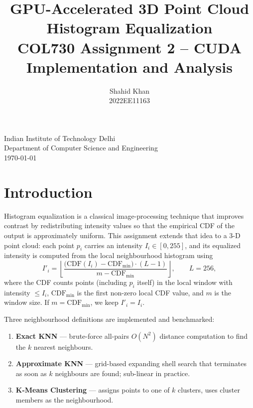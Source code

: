 \documentclass[11pt,a4paper]{article}
\title{\textbf{GPU-Accelerated 3D Point Cloud Histogram Equalization}\\
\large COL730 Assignment 2 -- CUDA Implementation and Analysis}
\author{Shahid Khan \\ 2022EE11163}
\date{}
\begin{document}
\maketitle
\thispagestyle{empty}
\vfill
\begin{center}
\large Indian Institute of Technology Delhi\\
Department of Computer Science and Engineering\\[0.5em]
\today
\end{center}
\newpage

\thispagestyle{empty}
\tableofcontents
\newpage

\section{Introduction}

Histogram equalization is a classical image-processing technique that improves
contrast by redistributing intensity values so that the empirical CDF of the
output is approximately uniform. This assignment extends that idea to a 3-D
point cloud: each point $p_i$ carries an intensity $I_i\in[0,255]$, and its
equalized intensity is computed from the local neighbourhood histogram using
\begin{equation}
      I'_i = \left\lfloor
      \frac{\bigl(\mathrm{CDF}(I_i)-\mathrm{CDF}_{\min}\bigr)\cdot(L-1)}{m-\mathrm{CDF}_{\min}}
      \right\rfloor,\qquad L=256,
\end{equation}
where the CDF counts points (including $p_i$ itself) in the local window with
intensity $\le I_i$, $\mathrm{CDF}_{\min}$ is the first non-zero local CDF
value, and $m$ is the window size.  If $m=\mathrm{CDF}_{\min}$, we keep
$I'_i=I_i$.

Three neighbourhood definitions are implemented and benchmarked:
\begin{enumerate}
  \item \textbf{Exact KNN} --- brute-force all-pairs $O(N^2)$ distance
        computation to find the $k$ nearest neighbours.
  \item \textbf{Approximate KNN} --- grid-based expanding shell search that
        terminates as soon as $k$ neighbours are found; sub-linear in practice.
  \item \textbf{K-Means Clustering} --- assigns points to one of $k$ clusters,
        uses cluster members as the neighbourhood.
\end{enumerate}
\end{document}
